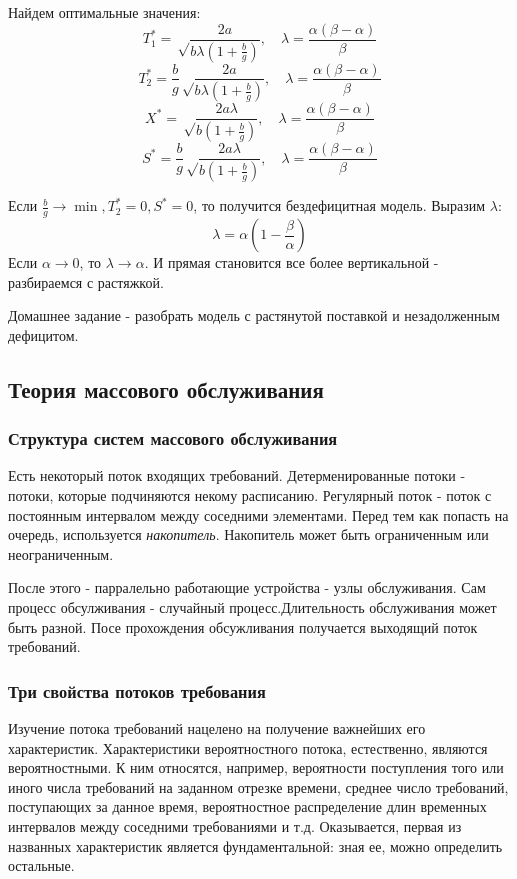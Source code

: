 \documentclass[aps,%
12pt,%
final,%
oneside,
onecolumn,%
musixtex, %
superscriptaddress,%
centertags]{article} %
\theoremstyle{plain}
\begin{document}
Найдем оптимальные значения:
$$T_1^* = \sqrt \frac{2a}{b\lambda (1+\frac{b}{g})}, \quad \lambda = \frac{\alpha(\beta-\alpha)}{\beta} $$
$$T_2^* = \frac{b}{g} \sqrt \frac{2a}{b\lambda (1+\frac{b}{g})}, \quad \lambda = \frac{\alpha(\beta-\alpha)}{\beta} $$
$$X^* = \sqrt \frac{2a\lambda}{b (1+\frac{b}{g})}, \quad \lambda = \frac{\alpha(\beta-\alpha)}{\beta} $$
$$S^* = \frac{b}{g} \sqrt \frac{2a\lambda}{b (1+\frac{b}{g})}, \quad \lambda = \frac{\alpha(\beta-\alpha)}{\beta} $$

Если $\frac{b}{g} \to \min , T_2^* = 0, S^* = 0$, то получится бездефицитная модель.
Выразим $\lambda$: 
$$ \lambda = \alpha (1-\frac{\beta}{\alpha})$$
Если $\alpha \to 0$, то $\lambda \to \alpha $. И прямая становится все более вертикальной - разбираемся с растяжкой.

Домашнее задание - разобрать модель с растянутой поставкой и незадолженным дефицитом.

\subsection{Теория массового обслуживания}

\subsubsection{Структура систем массового обслуживания}

Есть некоторый поток входящих требований. Детерменированные потоки - потоки, которые подчиняются некому расписанию. Регулярный поток - поток с постоянным интервалом между соседними элементами. Перед тем как попасть на очередь, используется \textit{накопитель}. Накопитель может быть ограниченным или неограниченным. 

После этого  - парралельно работающие устройства - узлы обслуживания. Сам процесс обсулживания - случайный процесс.Длительность обслуживания может быть разной. Посе прохождения обсужливания получается выходящий поток требований.

\subsubsection{Три свойства потоков требования}

Изучение потока требований нацелено на получение важнейших его характеристик. Характеристики вероятностного потока, естественно, являются вероятностными. К ним относятся, например, вероятности поступления того или иного числа требований на заданном отрезке времени, среднее число требований, поступающих за данное время, вероятностное распределение длин временных интервалов между соседними требованиями и т.д. Оказывается, первая из названных характеристик является фундаментальной: зная ее, можно определить остальные. 
\end{document}
